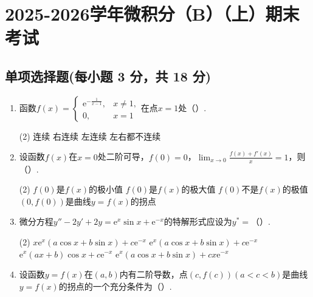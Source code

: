 \documentclass[../main.tex]{subfiles}
\begin{document}
\chapter{2025-2026学年微积分（B）（上）期末考试}

\section{单项选择题(每小题 3 分，共 18 分)}
\begin{enumerate}
    \item 函数$f(x)=
              \begin{cases}
                  \mathrm{e}^{-\frac{1}{x-1}}, & x\neq1, \\
                  0,                           & x=1
              \end{cases}$在点$x=1$处（\qquad）.

          \begin{tasks}[label=\textbf{\Alph*.}, label-width=1.5em, column-sep=1em](2)
              \task 连续
              \task 右连续
              \task 左连续
              \task 左右都不连续
          \end{tasks}

    \item 设函数$f(x)$在$x=0$处二阶可导，$f(0)=0$，$\lim_{x\to0}\frac{f(x)+f'(x)}{x}
              =1$，则（\qquad）.

          \begin{tasks}[label=\textbf{\Alph*.}, label-width=1.5em, column-sep=1em](2)
              \task $f(0)$是$f(x)$的极小值
              \task $f(0)$是$f(x)$的极大值
              \task $f(0)$不是$f(x)$的极值
              \task $(0,f(0))$是曲线$y=f(x)$的拐点
          \end{tasks}

    \item 微分方程$y''-2y'+2y=\mathrm{e}^{x}\sin x+\mathrm{e}^{-x}$的特解形式应设为$y
                  ^{*}=$（\qquad）.

          \begin{tasks}[label=\textbf{\Alph*.}, label-width=1.5em, column-sep=1em](2)
              \task $x\mathrm{e}^{x}(a\cos x+b\sin x)+c\mathrm{e}^{-x}$
              \task $\mathrm{e}^{x}(a\cos x+b\sin x)+c\mathrm{e}^{-x}$
              \task $\mathrm{e}^{x}(ax+b)\cos x+c\mathrm{e}^{-x}$
              \task $\mathrm{e}^{x}(a\cos x+b\sin x)+cx\mathrm{e}^{-x}$
          \end{tasks}

    \item 设函数$y=f(x)$在$(a,b)$内有二阶导数，点$(c,f(c))(a<c<b)$是曲线$y=f(x)$的拐点的一个充分条件为（\qquad）.


\end{enumerate}
\end{document}
